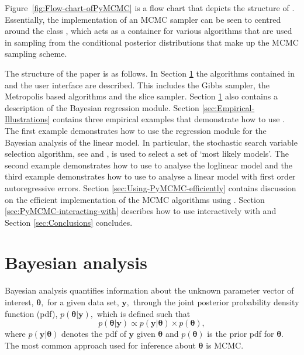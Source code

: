 \documentclass[article]{jss}
\begin{document}
Figure~\ref{fig:Flow-chart-ofPyMCMC} is a flow chart that depicts
the structure of . Essentially, the implementation of an MCMC
sampler can be seen to centred around the class , which
acts as a container for various algorithms that are used in sampling
from the conditional posterior distributions that make up the MCMC
sampling scheme. 

The structure of the paper is as follows. In Section
\ref{sec:Bayesian-Analysis} the algorithms contained in 
and the user interface are described.  This includes the Gibbs
sampler, the Metropolis based algorithms and the slice sampler.
Section \ref{sec:Bayesian-Analysis} also contains a description of the
Bayesian regression module. Section \ref{sec:Empirical-Illustrations}
contains three empirical examples that demonstrate how to use
.  The first example demonstrates how to use the
regression module for the Bayesian analysis of the linear model. In
particular, the stochastic search variable selection algorithm, see
\citet{GeorgeMcCulloch1993} and \citet{MarinRobert2007}, is used to
select a set of `most likely models'. The second example demonstrates
how to use  to analyse the loglinear model and the third
example demonstrates how to use  to analyse a linear model
with first order autoregressive errors.  Section
\ref{sec:Using-PyMCMC-efficiently} contains discussion on the
efficient implementation of the MCMC algorithms using .
Section \ref{sec:PyMCMC-interacting-with} describes how to use
 interactively with  and Section
\ref{sec:Conclusions} concludes.


\section{Bayesian analysis}
\label{sec:Bayesian-Analysis}

Bayesian analysis quantifies information about the unknown parameter
vector of interest, $\bm{\theta},$ for a given data set, $\bm{y},$
through the joint posterior probability density function (pdf),
$p(\bm{\theta}|\bm{y}),$ which is defined such that \begin{equation}
  p(\bm{\theta}|\bm{y})\propto p(\bm{y}|\bm{\theta})\times
  p(\bm{\theta}),\label{eq:joint post}\end{equation} where
$p(\bm{y}|\bm{\theta})$ denotes the pdf of $\bm{y}$ given
$\bm{\theta}$ and $p(\bm{\theta})$ is the prior pdf for $\bm{\theta}.$
The most common approach used for inference about $\bm{\theta}$ is
MCMC.
\end{document}
